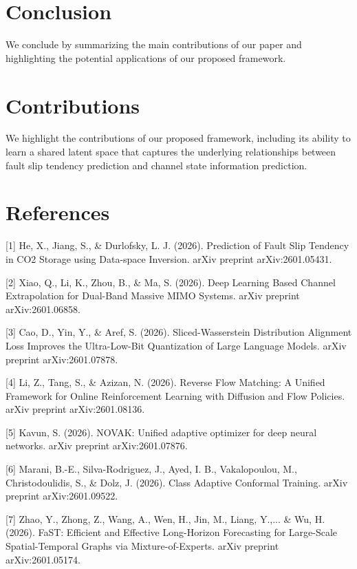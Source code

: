\documentclass{article}
\begin{document}
\section{Conclusion}

We conclude by summarizing the main contributions of our paper and highlighting the potential applications of our proposed framework.

\section{Contributions}

We highlight the contributions of our proposed framework, including its ability to learn a shared latent space that captures the underlying relationships between fault slip tendency prediction and channel state information prediction.

\section{References}

[1] He, X., Jiang, S., \& Durlofsky, L. J. (2026). Prediction of Fault Slip Tendency in CO2 Storage using Data-space Inversion. arXiv preprint arXiv:2601.05431.

[2] Xiao, Q., Li, K., Zhou, B., \& Ma, S. (2026). Deep Learning Based Channel Extrapolation for Dual-Band Massive MIMO Systems. arXiv preprint arXiv:2601.06858.

[3] Cao, D., Yin, Y., \& Aref, S. (2026). Sliced-Wasserstein Distribution Alignment Loss Improves the Ultra-Low-Bit Quantization of Large Language Models. arXiv preprint arXiv:2601.07878.

[4] Li, Z., Tang, S., \& Azizan, N. (2026). Reverse Flow Matching: A Unified Framework for Online Reinforcement Learning with Diffusion and Flow Policies. arXiv preprint arXiv:2601.08136.

[5] Kavun, S. (2026). NOVAK: Unified adaptive optimizer for deep neural networks. arXiv preprint arXiv:2601.07876.

[6] Marani, B.-E., Silva-Rodriguez, J., Ayed, I. B., Vakalopoulou, M., Christodoulidis, S., \& Dolz, J. (2026). Class Adaptive Conformal Training. arXiv preprint arXiv:2601.09522.

[7] Zhao, Y., Zhong, Z., Wang, A., Wen, H., Jin, M., Liang, Y.,... \& Wu, H. (2026). FaST: Efficient and Effective Long-Horizon Forecasting for Large-Scale Spatial-Temporal Graphs via Mixture-of-Experts. arXiv preprint arXiv:2601.05174.
\end{document}
